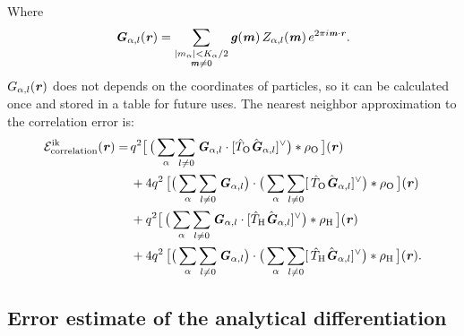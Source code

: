 \documentclass[aps,pre,preprint,unsortedaddress]{revtex4}
\renewcommand{\v}[1]{\textbf{\textit{#1}}}
\begin{document}
Where
\begin{align}
  \v G_{\alpha,l}(\v r) =
  \sum_{
    \begin{subarray}{c}
      \vert m_{\alpha}\vert < K_\alpha/2\\
      \v m\neq 0
    \end{subarray}}
  \v g(\v m)\,
  Z_{\alpha,l}(\v m)\,
  e^{2\pi i\v m\cdot\v r}.
\end{align}
$G_{\alpha,l}(\v r)$ does not depends on the coordinates of particles,
so it can be calculated once and stored in a table for future uses.
The nearest neighbor approximation to the correlation error is:
\begin{align}\nonumber
  \mathcal E^{\textrm{ik}}_{\textrm{correlation}}(\v r)
  =\,&
  q^2
  \big[\,
  \big(
  \sum_{\alpha} \sum_{l\neq 0}
  \v G_{\alpha,l}\cdot[\hat T_{\textrm{O}}\hat{\v G}_{\alpha,l}]^{\vee}
  \big)
  \ast \rho_{\textrm{O}}
  \,\big] (\v r) \\\nonumber
  \,&+
  4q^2\,
  \big[
  \big(
  \sum_{\alpha} \sum_{l\neq 0}  
  \v G_{\alpha,l}
  \big)
  \cdot
  \big(
  \sum_{\alpha} \sum_{l\neq 0}  
  [\,\hat T_{\textrm{O}}\hat{\v G}_{\alpha,l}]^{\vee}
  \big)
  \ast \rho_{\textrm{O}}\,
  \big] (\v r) \\\nonumber
  \,&+
  q^2
  \big[\,
  \big(
  \sum_{\alpha} \sum_{l\neq 0}
  \v G_{\alpha,l}\cdot[\hat T_{\textrm{H}}\hat{\v G}_{\alpha,l}]^{\vee}
  \big)
  \ast \rho_{\textrm{H}}
  \,\big] (\v r) \\
  \,&+
  4q^2\,
  \big[
  \big(
  \sum_{\alpha} \sum_{l\neq 0}  
  \v G_{\alpha,l}
  \big)
  \cdot
  \big(
  \sum_{\alpha} \sum_{l\neq 0}  
  [\,\hat T_{\textrm{H}}\hat{\v G}_{\alpha,l}]^{\vee}
  \big)
  \ast \rho_{\textrm{H}}\,
  \big] (\v r).
\end{align}


\subsection{Error estimate of the analytical differentiation}
\label{sec:error-ana}
\end{document}
